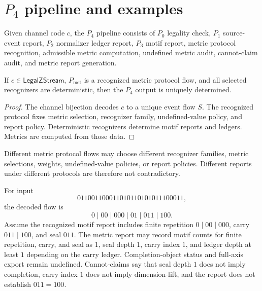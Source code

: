 \section{$P_4$ pipeline and examples}
\label{sec:metric-report-pipeline-examples}

\begin{definition}[$P_4$ pipeline]
\label{def:metric-report-p4-pipeline}
Given channel code $c$, the $P_4$ pipeline consists of $P_0$ legality check, $P_1$ source-event report, $P_2$ normalizer ledger report, $P_3$ motif report, metric protocol recognition, admissible metric computation, undefined metric audit, cannot-claim audit, and metric report generation.
\end{definition}

\begin{theorem}
\label{thm:metric-report-source-determined}
If $c\in\mathsf{LegalZStream}$, $P_{\mathrm{met}}$ is a recognized metric protocol flow, and all selected recognizers are deterministic, then the $P_4$ output is uniquely determined.
\end{theorem}

\begin{proof}
The channel bijection decodes $c$ to a unique event flow $S$. The recognized protocol fixes metric selection, recognizer family, undefined-value policy, and report policy. Deterministic recognizers determine motif reports and ledgers. Metrics are computed from those data.
\end{proof}

\begin{corollary}
\label{cor:metric-report-different-protocols}
Different metric protocol flows may choose different recognizer families, metric selections, weights, undefined-value policies, or report policies. Different reports under different protocols are therefore not contradictory.
\end{corollary}

\begin{example}
\label{ex:metric-report-completion}
For input
$$
  011001100011010110101011100011,
$$
the decoded flow is
$$
  0\mid 00\mid 000\mid 01\mid 011\mid 100.
$$
Assume the recognized motif report includes finite repetition $0\mid 00\mid 000$, carry $011\mid 100$, and seal $011$. The metric report may record motif counts for finite repetition, carry, and seal as $1$, seal depth $1$, carry index $1$, and ledger depth at least $1$ depending on the carry ledger. Completion-object status and full-axis export remain undefined. Cannot-claims say that seal depth $1$ does not imply completion, carry index $1$ does not imply dimension-lift, and the report does not establish $011=100$.
\end{example}

